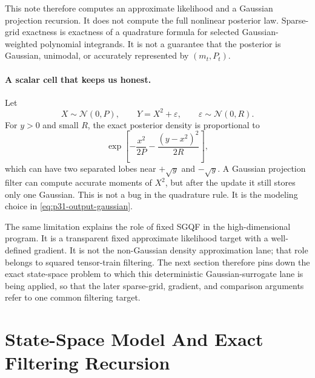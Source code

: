\documentclass[11pt]{article}
\numberwithin{equation}{section}
\newcommand{\N}{\mathcal N}
\begin{document}
This note therefore computes an approximate likelihood and a Gaussian
projection recursion.  It does not compute the full nonlinear posterior law.
Sparse-grid exactness is exactness of a quadrature formula for selected
Gaussian-weighted polynomial integrands.  It is not a guarantee that the
posterior is Gaussian, unimodal, or accurately represented by \((m_t,P_t)\).

\paragraph{A scalar cell that keeps us honest.}
Let
\begin{equation}
  X\sim\N(0,P),\qquad Y=X^2+\varepsilon,\qquad
  \varepsilon\sim\N(0,R).
  \label{eq:p31-quadratic-cell}
\end{equation}
For \(y>0\) and small \(R\), the exact posterior density is proportional to
\begin{equation}
  \exp\!\left[-\frac{x^2}{2P}
  -\frac{(y-x^2)^2}{2R}\right],
  \label{eq:p31-quadratic-posterior}
\end{equation}
which can have two separated lobes near \(+\sqrt y\) and \(-\sqrt y\).  A
Gaussian projection filter can compute accurate moments of \(X^2\), but after
the update it still stores only one Gaussian.  This is not a bug in the
quadrature rule.  It is the modeling choice in \eqref{eq:p31-output-gaussian}.

The same limitation explains the role of fixed SGQF in the high-dimensional
program.  It is a transparent fixed approximate likelihood target with a
well-defined gradient.  It is not the non-Gaussian density approximation lane;
that role belongs to squared tensor-train filtering.  The next section therefore
pins down the exact state-space problem to which this deterministic
Gaussian-surrogate lane is being applied, so that the later sparse-grid,
gradient, and comparison arguments refer to one common filtering target.

\section{State-Space Model And Exact Filtering Recursion}
\label{sec:p31-ssm}
\end{document}
